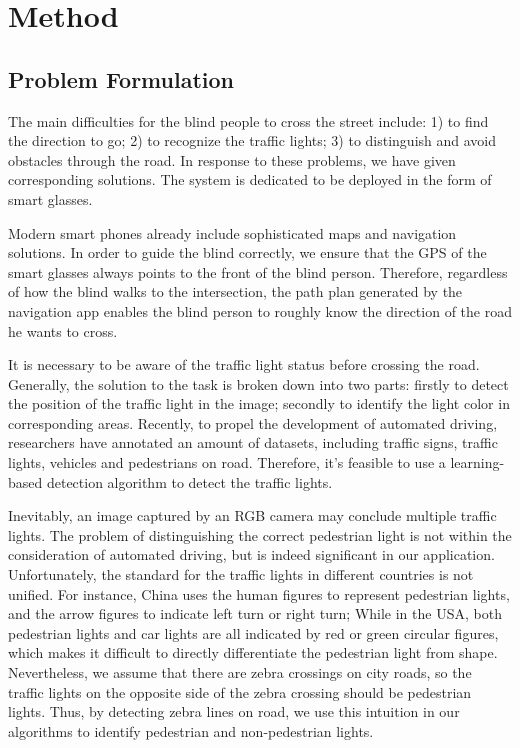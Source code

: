\section{Method}
\subsection{Problem Formulation}
The main difficulties for the blind people to cross the street include: 1) to find the direction to go; 2) to recognize the  traffic lights; 3) to distinguish and avoid obstacles through the road. In response to these problems, we have given corresponding solutions. The system is dedicated to be deployed in the form of smart glasses.

 Modern smart phones already include sophisticated maps and navigation solutions. In order to guide the blind correctly, we ensure that the GPS of the smart glasses always points to the front of the blind person. Therefore, regardless of how the blind walks to the intersection, the path plan generated by the navigation app enables the blind person to roughly know the direction of the road he wants to cross.

 It is necessary to be aware of the traffic light status before crossing the road. Generally, the solution to the task is broken down into two parts: firstly to detect the position of the traffic light in the image; secondly to identify the light color in corresponding areas. Recently, to propel the development of automated driving, researchers have annotated an amount of datasets, including traffic signs, traffic lights, vehicles and pedestrians on road. Therefore, it's feasible to use a learning-based detection algorithm to detect the traffic lights. 

Inevitably, an image captured by an RGB camera may conclude multiple traffic lights. The problem of distinguishing the correct pedestrian light is not within the consideration of automated driving, but is indeed significant in our application. Unfortunately, the standard for the traffic lights in different countries is not unified. For instance, China uses the human figures to represent pedestrian lights, and the arrow figures to indicate left turn or right turn; While in the USA, both pedestrian lights and car lights are all indicated by red or green circular figures, which makes it difficult to directly differentiate the pedestrian light from shape. Nevertheless, we assume that there are zebra crossings  on city roads, so the traffic lights on the opposite side of the zebra crossing should be pedestrian lights. Thus, by detecting zebra lines on road, we use this intuition in our algorithms to identify pedestrian and non-pedestrian lights.

